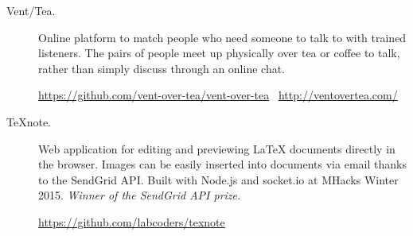 \documentclass{article}
\begin{document}
\begin{description}
    \item[Vent/Tea.] Online platform to match people who need someone to talk
        to with trained listeners. The pairs of people meet up physically over
        tea or coffee to talk, rather than simply discuss through an online
        chat.

        \url{https://github.com/vent-over-tea/vent-over-tea}~
        \url{http://ventovertea.com/}

    \item[TeXnote.] Web application for editing and previewing \LaTeX{} documents
        directly in the browser. Images can be easily inserted into documents
        via email thanks to the SendGrid API. Built with Node.js and
        socket.io at MHacks Winter 2015.
        \emph{Winner of the SendGrid API prize.}

        \url{https://github.com/labcoders/texnote}
\end{description}
\end{document}
